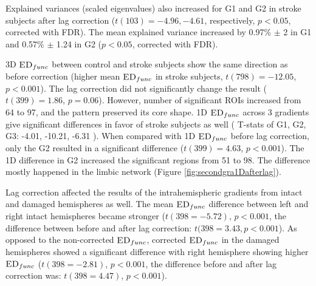 \documentclass[fleqn,10pt]{wlscirep}
\begin{document}
Explained variances (scaled eigenvalues) also increased for G1 and G2 in stroke subjects after lag correction ($t(103) = -4.96, -4.61$, respectively, $p < 0.05$, corrected with FDR). The mean explained variance increased by 0.97\% $\pm$ 2 in G1 and 0.57\% $\pm$ 1.24 in G2 ($p < 0.05$, corrected with FDR).  

3D $\textsc{ED}_{{func}}$ between control and stroke subjects show the same direction as before correction (higher mean $\textsc{ED}_{{func}}$ in stroke subjects, $t(798) = -12.05$, $p < 0.001$). 
The lag correction did not significantly change the result ( $t(399) = 1.86$, $p = 0.06$). However, number of significant ROIs increased from 64 to 97, and the pattern preserved its core shape. 
1D $\textsc{ED}_{{func}}$ across 3 gradients give significant differences in favor of stroke subjects as well ( T-stats of G1, G2, G3: -4.01, -10.21, -6.31 ). When compared with 1D $\textsc{ED}_{{func}}$ before lag correction, only the G2 resulted in a significant difference ($t(399) = 4.63$, $p < 0.001$). The 1D difference in G2 increased the significant regions from 51 to 98. The difference mostly happened in the limbic network (Figure \ref{fig:secondgra1Dafterlag}). 

Lag correction affected the results of the intrahemispheric gradients from intact and damaged hemispheres as well. The mean $\textsc{ED}_{{func}}$ difference between left and right intact hemispheres became stronger ($t(398 = -5.72)$, $p < 0.001$, the difference between before and after lag correction: $t(398 = 3.43, p < 0.001$). As opposed to the non-corrected $\textsc{ED}_{{func}}$, corrected $\textsc{ED}_{{func}}$ in the damaged hemispheres showed a significant difference with right hemisphere showing higher $\textsc{ED}_{{func}}$ ($t(398 = -2.81)$, $p < 0.001$, the difference before and after lag correction was: $t(398 = 4.47)$, $p < 0.001$). 
\end{document}
